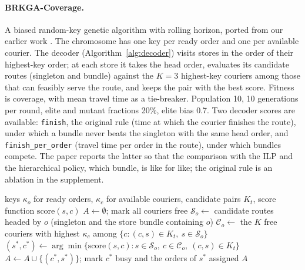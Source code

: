 \documentclass[preprint,12pt,authoryear]{elsarticle}%
\begin{document}
\paragraph{BRKGA-Coverage.} A biased random-key genetic algorithm \citep{goncalves2011biased} with rolling horizon, ported from our earlier work \citep{giraldo2026brkga}. The chromosome has one key per ready order and one per available courier. The decoder (Algorithm~\ref{alg:decoder}) visits stores in the order of their highest-key order; at each store it takes the head order, evaluates its candidate routes (singleton and bundle) against the $K = 3$ highest-key couriers among those that can feasibly serve the route, and keeps the pair with the best score. Fitness is coverage, with mean travel time as a tie-breaker. Population 10, 10 generations per round, elite and mutant fractions 20\%, elite bias 0.7. Two decoder scores are available: \texttt{finish}, the original rule (time at which the courier finishes the route), under which a bundle never beats the singleton with the same head order, and \texttt{finish\_per\_order} (travel time per order in the route), under which bundles compete. The paper reports the latter so that the comparison with the ILP and the hierarchical policy, which bundle, is like for like; the original rule is an ablation in the supplement.

\begin{algorithm}[ht]
\caption{BRKGA decoder shared by BRKGA-Coverage, BRKGA-Fair and Pay-BRKGA (round $t$)}
\label{alg:decoder}
\begin{algorithmic}[1]
\Require keys $\kappa_o$ for ready orders, $\kappa_c$ for available couriers, candidate pairs $K_t$, score function $\text{score}(s, c)$
\State $A \gets \emptyset$; mark all couriers free
    \State $\mathcal{S}_o \gets$ candidate routes headed by $o$ (singleton and the store bundle containing $o$)
    \State $\mathcal{C}_o \gets$ the $K$ free couriers with highest $\kappa_c$ among $\{c : (c,s) \in K_t,\ s \in \mathcal{S}_o\}$
      \State $(s^*, c^*) \gets \arg\min \{\text{score}(s, c) : s \in \mathcal{S}_o,\ c \in \mathcal{C}_o,\ (c,s) \in K_t\}$
      \State $A \gets A \cup \{(c^*, s^*)\}$; mark $c^*$ busy and the orders of $s^*$ assigned
    \EndIf
  \EndFor
\EndFor
\State \Return $A$
\end{algorithmic}
\end{algorithm}
\end{document}
